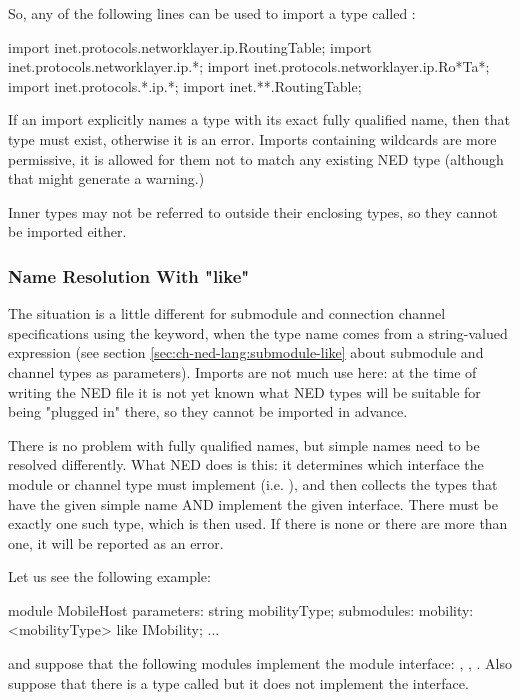 So, any of the following lines can be used to import a type called
:

\begin{ned}
import inet.protocols.networklayer.ip.RoutingTable;
import inet.protocols.networklayer.ip.*;
import inet.protocols.networklayer.ip.Ro*Ta*;
import inet.protocols.*.ip.*;
import inet.**.RoutingTable;
\end{ned}

If an import explicitly names a type with its exact fully qualified name,
then that type must exist, otherwise it is an error. Imports containing
wildcards are more permissive, it is allowed for them not to match any
existing NED type (although that might generate a warning.)

Inner types may not be referred to outside their enclosing types, so they
cannot be imported either.


\subsubsection{Name Resolution With "like"}

The situation is a little different for submodule and connection channel
specifications using the  keyword, when the type name comes
from a string-valued expression (see section
\ref{sec:ch-ned-lang:submodule-like} about submodule and channel types as
parameters). Imports are not much use here: at the time of writing the NED
file it is not yet known what NED types will be suitable for being "plugged
in" there, so they cannot be imported in advance.

There is no problem with fully qualified names, but simple names need
to be resolved differently. What NED does is this: it determines which
interface the module or channel type must implement (i.e. ),
and then collects the types that have the given simple name AND implement
the given interface. There must be exactly one such type, which is then used.
If there is none or there are more than one, it will be reported as an error.

Let us see the following example:

\begin{ned}
module MobileHost
{
    parameters:
        string mobilityType;
    submodules:
        mobility: <mobilityType> like IMobility;
        ...
}
\end{ned}

and suppose that the following modules implement the  module
interface: , ,
. Also suppose that there is a type
called  but it does not implement the
interface.

